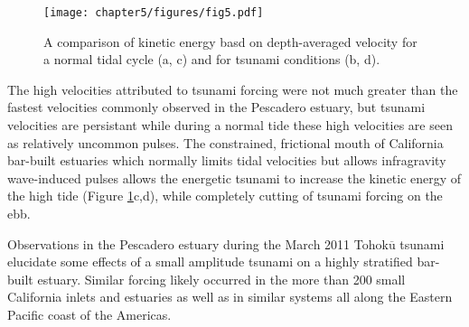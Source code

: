 \begin{figure}
\centering
\texttt{[image: chapter5/figures/fig5.pdf]}

\protect\caption{A comparison of kinetic energy basd on depth-averaged velocity for
a normal tidal cycle (a, c) and for tsunami conditions (b, d). \label{fig:kinetic_energy}}
\end{figure}


The high velocities attributed to tsunami forcing were not much greater
than the fastest velocities commonly observed in the Pescadero estuary,
but tsunami velocities are persistant while during a normal tide these
high velocities are seen as relatively uncommon pulses. The constrained,
frictional mouth of California bar-built estuaries which normally
limits tidal velocities but allows infragravity wave-induced pulses
allows the energetic tsunami to increase the kinetic energy of the
high tide (Figure \ref{fig:kinetic_energy}c,d), while completely
cutting of tsunami forcing on the ebb. 

Observations in the Pescadero estuary during the March 2011 Tohok$\overline{\mathrm{u}}$
tsunami elucidate some effects of a small amplitude tsunami on a highly
stratified bar-built estuary. Similar forcing likely occurred in the
more than 200 small California inlets and estuaries as well as in similar
systems all along the Eastern Pacific coast of the Americas. 





